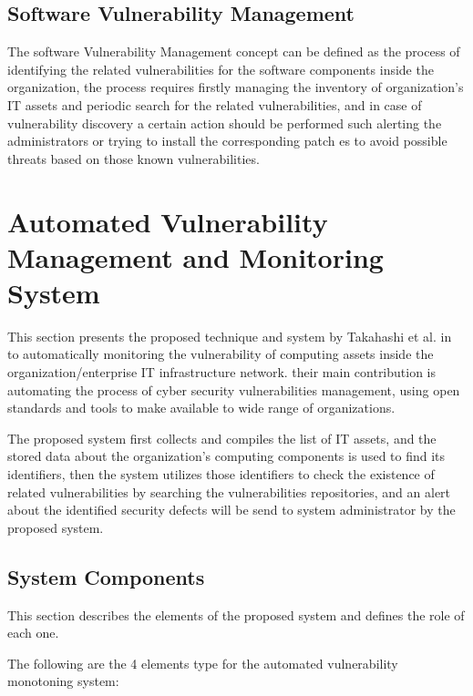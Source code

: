\documentclass{llncs}
\begin{document}
\subsection{Software Vulnerability Management}

\par The software Vulnerability Management concept can be defined as the process of identifying the related vulnerabilities for the software components inside the organization, the process requires firstly managing the inventory of organization's IT assets and periodic search for the related vulnerabilities, and in case of vulnerability discovery a certain action should be performed such alerting the administrators or trying to install the corresponding patch es to avoid possible threats based on those known vulnerabilities.     
\newpage
\section{Automated Vulnerability Management and Monitoring System}

\par This section presents the proposed technique and system by Takahashi et al. in \cite{paper1} to automatically monitoring the vulnerability of computing assets
inside the organization/enterprise IT infrastructure network. their main contribution is automating the process of cyber security vulnerabilities management, using open standards and tools to make available to wide range of organizations.
\par
 The proposed system first collects and compiles the list of IT assets, and the stored data about the organization's computing components is used to find its identifiers, then the system  utilizes those identifiers to check the existence of related vulnerabilities by searching the vulnerabilities repositories, and an alert about the identified security defects will be send to system administrator by the proposed system.
    
\subsection{System Components}

\par This section describes the elements of the proposed system and defines the role of each one. 

The following are the 4 elements type for the automated vulnerability monotoning system:
\end{document}

